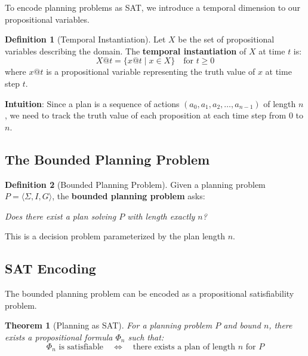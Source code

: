 \documentclass[11pt,a4paper]{article}
\theoremstyle{definition}
\newtheorem{definition}{Definition}[section]
\theoremstyle{plain}
\newtheorem{theorem}{Theorem}[section]
\theoremstyle{remark}
\begin{document}
To encode planning problems as SAT, we introduce a temporal dimension to our propositional variables.

\begin{tcolorbox}[colback=blue!5!white,colframe=blue!75!black,title=\textbf{Temporal Instantiation}]
\begin{definition}[Temporal Instantiation]
Let $X$ be the set of propositional variables describing the domain. The \textbf{temporal instantiation} of $X$ at time $t$ is:
\[
X@t = \{x@t \mid x \in X\} \quad \text{for } t \geq 0
\]
where $x@t$ is a propositional variable representing the truth value of $x$ at time step $t$.
\end{definition}
\end{tcolorbox}

\textbf{Intuition}: Since a plan is a sequence of actions $(a_0, a_1, a_2, \dots, a_{n-1})$ of length $n$, we need to track the truth value of each proposition at each time step from $0$ to $n$.

\subsection{The Bounded Planning Problem}

\begin{tcolorbox}[colback=orange!10!white,colframe=orange!75!black,title=\textbf{Bounded Planning Problem}]
\begin{definition}[Bounded Planning Problem]
Given a planning problem $P = \langle \Sigma, I, G \rangle$, the \textbf{bounded planning problem} asks:

\textit{Does there exist a plan solving $P$ with length exactly $n$?}
\end{definition}
\end{tcolorbox}

This is a decision problem parameterized by the plan length $n$.

\subsection{SAT Encoding}

The bounded planning problem can be encoded as a propositional satisfiability problem.

\begin{tcolorbox}[colback=red!5!white,colframe=red!75!black,title=\textbf{Planning as SAT}]
\begin{theorem}[Planning as SAT]
For a planning problem $P$ and bound $n$, there exists a propositional formula $\Phi_n$ such that:
\[
\Phi_n \text{ is satisfiable} \quad \Leftrightarrow \quad \text{there exists a plan of length } n \text{ for } P
\]
\end{theorem}
\end{tcolorbox}
\end{document}
